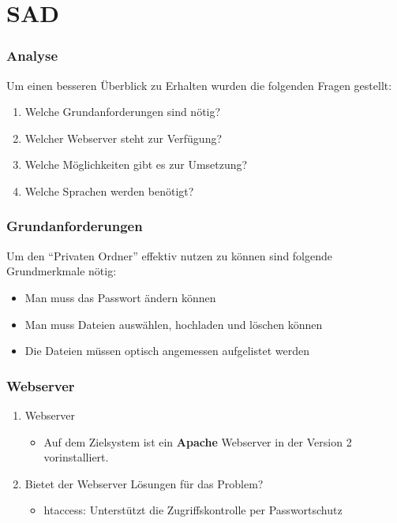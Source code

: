 \section{SAD}
\begin{frame} %
  \frametitle{Analyse} %

  Um einen besseren Überblick zu Erhalten wurden die folgenden Fragen gestellt:
  \bigskip
  \begin{enumerate}
   \item Welche Grundanforderungen sind nötig?
   \item Welcher Webserver steht zur Verfügung?
   \item Welche Möglichkeiten gibt es zur Umsetzung?
   \item Welche Sprachen werden benötigt?
  \end{enumerate}

\end{frame}

\begin{frame} %
  \frametitle{Grundanforderungen} %

   Um den "`Privaten Ordner"' effektiv nutzen zu können sind folgende Grundmerkmale nötig:
   \bigskip
   \begin{itemize}
    \item Man muss das Passwort ändern können
    \item Man muss Dateien auswählen, hochladen und löschen können
    \item Die Dateien müssen optisch angemessen aufgelistet werden
   \end{itemize}

\end{frame}

\begin{frame} %
  \frametitle{Webserver} %
  \begin{enumerate}
   \item Webserver
   \begin{itemize}
    \item Auf dem Zielsystem ist ein \textbf{Apache} Webserver in der Version 2 vorinstalliert.
   \end{itemize}
   \bigskip
   \item Bietet der Webserver Lösungen für das Problem?
   \begin{itemize}
    \item htaccess: Unterstützt die Zugriffskontrolle per Passwortschutz
   \end{itemize}

  \end{enumerate}


\end{frame}

